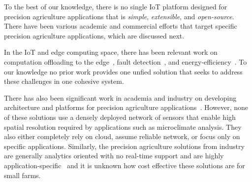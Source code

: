 To the best of our knowledge, there is no single IoT platform designed for precision agriculture applications that is \emph{simple}, \emph{extensible}, and \emph{open-source}. There have been various academic and commercial efforts that target specific precision agriculture applications, which are discussed next. 

In the IoT and edge computing space, there has been relevant work on computation offloading to the edge~\cite{computation-offloading,reality-check-edge}, fault detection~\cite{fall-curve}, and energy-efficiency~\cite{wsn-pa}. To our knowledge no prior work provides one unfied solution that seeks to address these challenges in one cohesive system.

There has also been significant work in academia and industry on developing architecture and platforms for precision agriculture applications~\cite{vasisht2017farmbeats, smart-farming, smart-farm-arch, towards-smart-farming, energy-efficient-pa-system, precision-monitor-cabbage}. However, none of these solutions use a densely deployed network of sensors that enable high spatial resolution required by applications such as microclimate analysis. They also either completely rely on cloud, assume reliable network, or focus only on specific applications. Similarly, the precision agriculture solutions from industry are generally analytics oriented with no real-time support and are highly application-specific~\cite{see&spray, cropx, precisionhawk, fieldagent-sentera} and it is unknown how cost effective these solutions are for small farms. 



